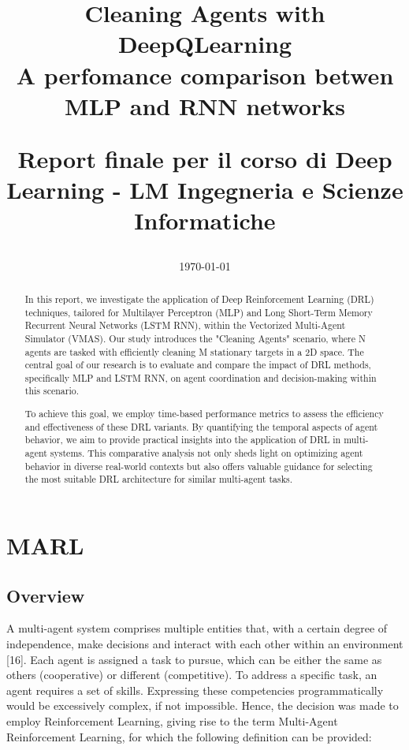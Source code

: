 \documentclass{scrartcl}
\title{Cleaning Agents with DeepQLearning
\\
A perfomance comparison betwen MLP and RNN networks
\\
\begin{small} 
  Report finale per il corso di Deep Learning  - 
  LM Ingegneria e Scienze Informatiche
\end{small}
}
\author{
    \emailaddr{filippo.cavallari2@studio.unibo.it}
}
\date{\today}
\begin{document}
\maketitle

\newpage

\begin{abstract}
  In this report, we investigate the application of Deep Reinforcement Learning (DRL) techniques, tailored for 
  Multilayer Perceptron (MLP) and Long Short-Term Memory Recurrent Neural Networks (LSTM RNN), within the 
  Vectorized Multi-Agent Simulator (VMAS).
  Our study introduces the "Cleaning Agents" scenario, where N agents are tasked with efficiently cleaning M 
  stationary targets in a 2D space. The central goal of our research is to evaluate and compare the impact of 
  DRL methods, specifically MLP and LSTM RNN, on agent coordination and decision-making within this scenario.
  
  To achieve this goal, we employ time-based performance metrics to assess the efficiency and effectiveness of 
  these DRL variants. By quantifying the temporal aspects of agent behavior, we aim to provide practical insights 
  into the application of DRL in multi-agent systems. This comparative analysis not only sheds light on 
  optimizing agent behavior in diverse real-world contexts but also offers valuable guidance for selecting the 
  most suitable DRL architecture for similar multi-agent tasks.\end{abstract}
\newpage
\tableofcontents


\newpage

\section{MARL}

\subsection{Overview}
A multi-agent system comprises multiple entities that, with a certain degree of independence, make decisions 
and interact with each other within an environment [16]. Each agent is assigned a task to pursue, which can be 
either the same as others (cooperative) or different (competitive). To address a specific task, an agent 
requires a set of skills. Expressing these competencies programmatically would be excessively complex, if not 
impossible. Hence, the decision was made to employ Reinforcement Learning, giving rise to the term Multi-Agent 
Reinforcement Learning, for which the following definition can be provided:
\end{document}
